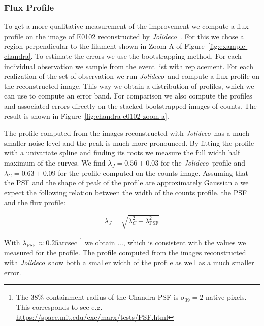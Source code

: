 \documentclass[twocolumn]{aastex631}
\newcommand{\chandra}{\textit{Chandra}~}
\newcommand{\xmm}{\textit{XMM}~}
\newcommand{\jolideco}{\textit{Jolideco}~}
\begin{document}
    \subsubsection{Flux Profile}
    To get a more qualitative measurement of the improvement we compute a flux profile on the image of E0102 reconstructed by \jolideco. For this we chose a region perpendicular to the filament shown in Zoom A of Figure~\ref{fig:example-chandra}. To estimate the errors we use the bootstrapping method. For each individual observation we sample from the event list with replacement. For each realization of the set of observation we run \jolideco and compute a flux profile on the reconstructed image. This way we obtain a distribution of profiles, which we can use to compute an error band. For comparison we also compute the profiles and associated errors directly on the stacked bootstrapped images of counts. The result is shown in Figure~\ref{fig:chandra-e0102-zoom-a}.

    The profile computed from the images reconstructed with \jolideco has a much smaller noise level and the peak is much more pronounced. By fitting the profile with a univariate spline and finding its roots we measure the full width half maximum of the curves. We find $\lambda_J=0.56\pm0.03$ for the \jolideco profile and $\lambda_C=0.63\pm0.09$ for the profile computed on the counts image. Assuming that the PSF and the shape of peak of the profile are approximately Gaussian a we expect the following relation between the width of the counts profile, the PSF and the flux profile:

    \begin{equation}
        \lambda_{J} = \sqrt{\lambda_C^2 - \lambda_{\mathrm{PSF}}^2}
    \end{equation}

    With $\lambda_{\mathrm{PSF}} \approx 0.25 \mathrm{arcsec}$ \footnote{The 38\% containment radius of the Chandra PSF is $\sigma_{39}=2$ native pixels. This corresponds to  see e.g. \url{https://space.mit.edu/cxc/marx/tests/PSF.html}}
    we obtain ..., which is consistent with the values we measured for the profile. The profile computed from the images reconstructed with \jolideco show both a smaller width of the profile as well as a much smaller error. 
    

        
\end{document}
